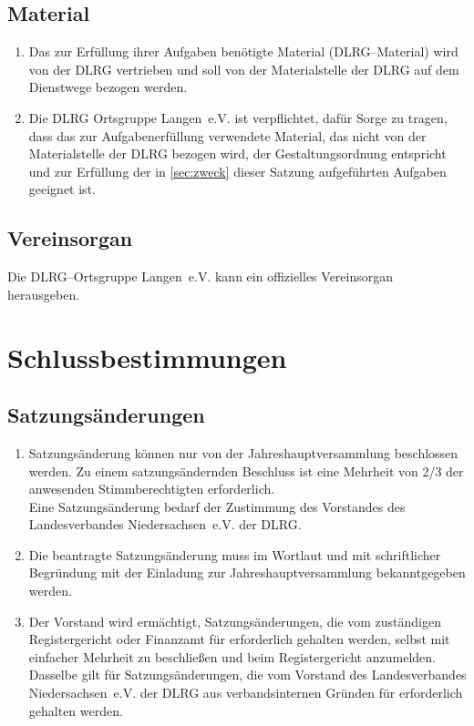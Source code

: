 \documentclass[%
12pt, %
a4paper, %
headsepline, %
parskip, %
headings=normal, %
]{scrreprt}
\begin{document}
\section{Material}
\label{sec:material}
\begin{enumerate}
    \item Das zur Erfüllung ihrer Aufgaben benötigte Material (DLRG--Material) wird von der DLRG vertrieben und soll von der Materialstelle der DLRG auf dem Dienstwege bezogen werden.
    \item Die DLRG Ortsgruppe Langen~e.V. ist verpflichtet, dafür Sorge zu tragen, dass das zur Aufgabenerfüllung verwendete Material, das nicht von der Materialstelle der DLRG bezogen wird, der Gestaltungsordnung entspricht und zur Erfüllung der in \ref{sec:zweck} dieser Satzung aufgeführten Aufgaben geeignet ist.
\end{enumerate}

\section{Vereinsorgan}
\label{sec:vereinsorgan}
Die DLRG--Ortsgruppe Langen~e.V. kann ein offizielles Vereinsorgan herausgeben.

\chapter{Schlussbestimmungen}
\setcounter{section}{12}
\section{Satzungsänderungen}
\label{sec:satzungsaenderungen}
\begin{enumerate}
    \item Satzungsänderung können nur von der Jahreshauptversammlung beschlossen werden. Zu einem satzungsändernden Beschluss ist eine Mehrheit von \num{2/3} der anwesenden Stimmberechtigten erforderlich.\\
      Eine Satzungsänderung bedarf der Zustimmung des Vorstandes des Landesverbandes Niedersachsen~e.V. der DLRG.
    \item Die beantragte Satzungsänderung muss im Wortlaut und mit schriftlicher Begründung mit der Einladung zur Jahreshauptversammlung bekanntgegeben werden.
    \item Der Vorstand wird ermächtigt, Satzungsänderungen, die vom zuständigen Registergericht oder Finanzamt für erforderlich gehalten werden, selbst mit einfacher Mehrheit zu beschließen und beim Registergericht anzumelden. Dasselbe gilt für Satzungsänderungen, die vom Vorstand des Landesverbandes Niedersachsen~e.V. der DLRG aus verbandsinternen Gründen für erforderlich gehalten werden.
\end{enumerate}
\end{document}
